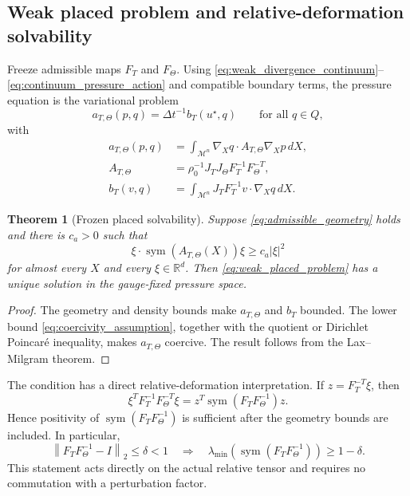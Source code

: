 \documentclass[11pt]{article}
\theoremstyle{plain}
\newtheorem{theorem}{Theorem}[section]
\theoremstyle{definition}
\theoremstyle{remark}
\newcommand{\R}{\mathbb{R}}
\newcommand{\M}{\mathcal{M}}
\newcommand{\sym}{\operatorname{sym}}
\newcommand{\dt}{\Delta t}
\newcommand{\Th}{\Theta}
\newcommand{\norm}[2][]{\left\lVert #2\right\rVert_{#1}}
\begin{document}
\subsection{Weak placed problem and relative-deformation solvability}

Freeze admissible maps $F_T$ and $F_\Th$.  Using
\eqref{eq:weak_divergence_continuum}--\eqref{eq:continuum_pressure_action} and
compatible boundary terms, the pressure equation is the variational problem
\begin{equation}
  a_{T,\Th}(p,q)=\dt^{-1}b_T(u^\star,q)
  \qquad\text{for all }q\in Q,
  \label{eq:weak_placed_problem}
\end{equation}
with
\begin{align}
 a_{T,\Th}(p,q)
 &=\int_{\M^n}\nabla_Xq\cdot A_{T,\Th}\nabla_Xp\,dX,
 \label{eq:placed_bilinear}\\
 A_{T,\Th}
 &=\rho_0^{-1}J_TJ_\Th F_T^{-1}F_\Th^{-T},
 \label{eq:relative_tensor}\\
 b_T(v,q)
 &=\int_{\M^n}J_TF_T^{-1}v\cdot\nabla_Xq\,dX.
 \label{eq:terminal_load}
\end{align}

\begin{theorem}[Frozen placed solvability]
\label{thm:placed_solvability}
Suppose \eqref{eq:admissible_geometry} holds and there is $c_a>0$ such that
\begin{equation}
  \xi\cdot\sym(A_{T,\Th}(X))\xi\ge c_a|\xi|^2
  \label{eq:coercivity_assumption}
\end{equation}
for almost every $X$ and every $\xi\in\R^d$.  Then
\eqref{eq:weak_placed_problem} has a unique solution in the gauge-fixed
pressure space.
\end{theorem}

\begin{proof}
The geometry and density bounds make $a_{T,\Th}$ and $b_T$ bounded.  The
lower bound \eqref{eq:coercivity_assumption}, together with the quotient or
Dirichlet Poincar\'e inequality, makes $a_{T,\Th}$ coercive.  The result follows
from the Lax--Milgram theorem.
\end{proof}

The condition has a direct relative-deformation interpretation.  If
$z=F_T^{-T}\xi$, then
\begin{equation}
 \xi^TF_T^{-1}F_\Th^{-T}\xi
 =z^T\sym(F_TF_\Th^{-1})z.
 \label{eq:relative_deformation_rewrite}
\end{equation}
Hence positivity of
$\sym(F_TF_\Th^{-1})$ is sufficient after the geometry bounds are included.
In particular,
\begin{equation}
 \norm[2]{F_TF_\Th^{-1}-I}\le\delta<1
 \quad\Longrightarrow\quad
 \lambda_{\min}\!\left(\sym(F_TF_\Th^{-1})\right)\ge1-\delta.
 \label{eq:small_relative_deformation_condition}
\end{equation}
This statement acts directly on the actual relative tensor and requires no
commutation with a perturbation factor.
\end{document}
